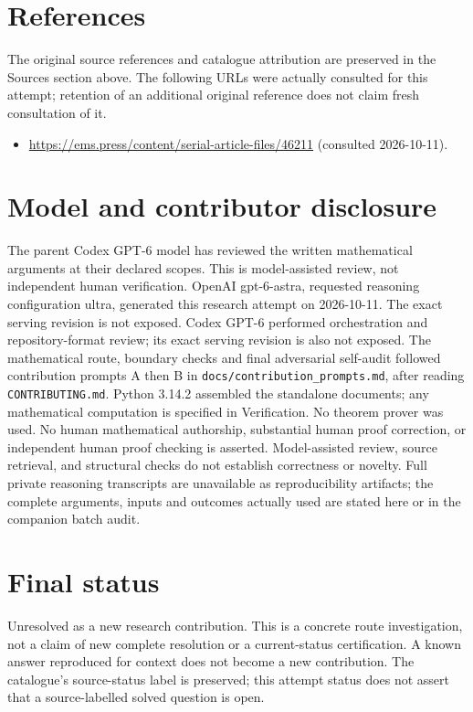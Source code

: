 \documentclass[11pt]{article}
\begin{document}
\section{References}
The original source references and catalogue attribution are preserved in the
Sources section above. The following URLs were actually consulted for this attempt;
retention of an additional original reference does not claim fresh consultation of it.
\begin{itemize}
\item \url{https://ems.press/content/serial-article-files/46211} (consulted 2026-10-11). 
\end{itemize}
\section{Model and contributor disclosure}
The parent Codex GPT-6 model has reviewed the written mathematical arguments at their declared scopes. This is model-assisted review, not independent human verification.
OpenAI gpt-6-astra, requested reasoning configuration ultra, generated this research
attempt on 2026-10-11. The exact serving revision is not exposed. Codex GPT-6
performed orchestration and repository-format review; its exact serving revision
is also not exposed. The mathematical route, boundary checks and final adversarial
self-audit followed contribution prompts A then B in
\texttt{docs/contribution\_prompts.md}, after reading \texttt{CONTRIBUTING.md}.
Python 3.14.2 assembled the standalone documents; any mathematical computation is
specified in Verification. No theorem prover was used. No human mathematical
authorship, substantial human proof correction, or independent human proof checking
is asserted. Model-assisted review, source retrieval, and structural checks do not
establish correctness or novelty. Full private reasoning transcripts are unavailable
as reproducibility artifacts; the complete arguments, inputs and outcomes actually
used are stated here or in the companion batch audit.
\section{Final status}
Unresolved as a new research contribution. This is a concrete route investigation,
not a claim of new complete resolution or a current-status certification. A known
answer reproduced for context does not become a new contribution. The catalogue's
source-status label is preserved; this attempt status does not assert that a
source-labelled solved question is open.
\end{document}
